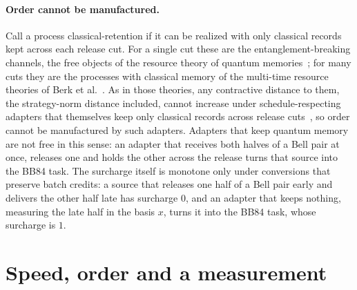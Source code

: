 \documentclass[11pt]{article}
\theoremstyle{definition}
\theoremstyle{remark}
\begin{document}
\paragraph{Order cannot be manufactured.} Call a process classical-retention if it can be realized with only classical records kept across each release cut. For a single cut these are the entanglement-breaking channels, the free objects of the resource theory of quantum memories~\cite{RBL18}; for many cuts they are the processes with classical memory of the multi-time resource theories of Berk et al.~\cite{Berk21}. As in those theories, any contractive distance to them, the strategy-norm distance included, cannot increase under schedule-respecting adapters that themselves keep only classical records across release cuts~\cite[Thm.~1]{Berk21}, so order cannot be manufactured by such adapters. Adapters that keep quantum memory are not free in this sense: an adapter that receives both halves of a Bell pair at once, releases one and holds the other across the release turns that source into the BB84 task. The surcharge itself is monotone only under conversions that preserve batch credits: a source that releases one half of a Bell pair early and delivers the other half late has surcharge $0$, and an adapter that keeps nothing, measuring the late half in the basis $x$, turns it into the BB84 task, whose surcharge is $1$.

\section{Speed, order and a measurement}\label{sec:measure}
\end{document}
